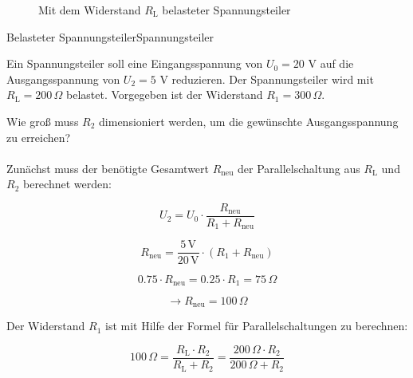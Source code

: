 \begin{frame}
{\begin{figure}[h!]
\begin{center}
		\caption{Mit dem Widerstand $R_\mathrm{L}$ belasteter Spannungsteiler}
		\label{fig:belspannungsteiler}
	\end{center}
\end{figure}





\begin{bsp}{Belasteter Spannungsteiler}{Spannungsteiler}

	Ein Spannungsteiler soll eine Eingangsspannung von $U_0 = 20$ V auf die Ausgangsspannung von $U_2 = 5$ V reduzieren. 
	Der Spannungsteiler wird mit $R_\mathrm{L} = 200 \, \Omega$ belastet.
	Vorgegeben ist der Widerstand $R_1 = 300 \, \Omega$.
	
	Wie groß muss $R_2$ dimensioniert werden, um die gewünschte Ausgangsspannung zu erreichen?\\

	\phantom{.}\\


	Zunächst muss der benötigte Gesamtwert $R_\mathrm{neu}$ der Parallelschaltung aus $R_\mathrm{L}$ und $R_2$ berechnet werden:

	\begin{equation*}
		U_2 = U_0 \cdot \frac{R_\mathrm{neu}}{R_1+R_\mathrm{neu}}
	\end{equation*}

	\begin{equation*}
		R_\mathrm{neu} = \frac{5 \, \mathrm{V}}{20 \, \mathrm{V}} \cdot (R_1 + R_\mathrm{neu})
	\end{equation*}

	\begin{equation*}
		0.75 \cdot R_\mathrm{neu} = 0.25 \cdot R_1 = 75 \, \Omega
	\end{equation*}

	\begin{equation*}
		\rightarrow R_\mathrm{neu} = 100 \, \Omega
	\end{equation*}

	Der Widerstand $R_1$ ist mit Hilfe der Formel für Parallelschaltungen zu berechnen:

	\begin{equation*}
		100 \, \Omega = \frac{R_\mathrm{L} \cdot R_2}{R_\mathrm{L} + R_2} = \frac{200 \, \Omega \cdot R_2}{200 \, \Omega + R_2}
	\end{equation*}


\end{bsp}}
\end{frame}
